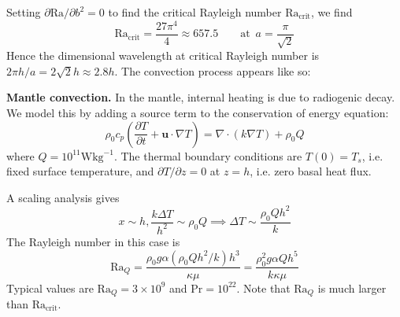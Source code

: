 \documentclass{jknotes}
\begin{document}
Setting $\partial \text{Ra}/\partial b^2 = 0$ to find the critical Rayleigh
number $\text{Ra}_{\text{crit}}$, we find
\begin{equation}
 \text{Ra}_{\text{crit}} = \frac{27 \pi^4}{4} \approx 657.5 \hspace{2em}
 \text{at}\,\,\, a = \frac{\pi}{\sqrt{2}}
\end{equation}
Hence the dimensional wavelength at critical Rayleigh number is $2\pi h/a =
2\sqrt{2} h \approx 2.8 h$. The convection process appears like so:
\begin{center}
\end{center}

\begin{eg}
	\textbf{Mantle convection.} In the mantle, internal heating is due to
	radiogenic decay. We model this by adding a source term to the conservation of
	energy equation:
	\begin{equation}
		\rho_0 c_p \left( \frac{\partial T}{\partial t} + \symbf{u}\cdot\nabla
		T\right) = \nabla \cdot (k\nabla T) + \rho_0 Q
	\end{equation}
	where $Q = 10^{11} \text{W} \text{kg}^{-1}$. The thermal boundary conditions
	are $T(0) = T_s$, i.e. fixed surface temperature, and $\partial T / \partial
	z = 0$ at $z=h$, i.e. zero basal heat flux.

	A scaling analysis gives 
	\begin{equation}
		x \sim h, \frac{k \Delta T}{h^2} \sim \rho_0 Q
		\implies \Delta T \sim \frac{\rho_0 Q h^2}{k}
	\end{equation}
	The Rayleigh number in this case is
	\begin{equation}
		\text{Ra}_Q = \frac{\rho_0 g \alpha (\rho_0 Q h^2 / k) h^3}{\kappa \mu} =
		\frac{\rho_0^2 g \alpha Q h^5}{k \kappa \mu}
	\end{equation}
	Typical values are $\text{Ra}_Q = 3 \times 10^9$ and $\text{Pr} = 10^{22}$.
	Note that $\text{Ra}_Q$ is much larger than $\text{Ra}_{\text{crit}}$.
\end{eg}
\end{document}
